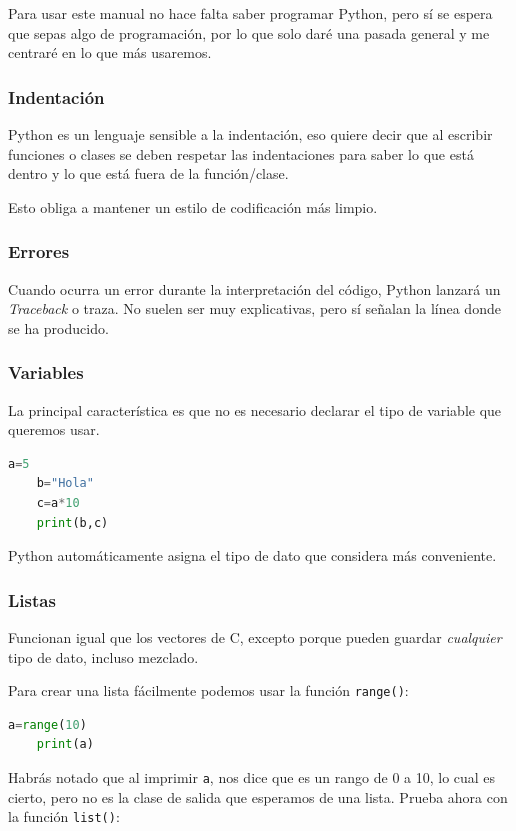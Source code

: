 \documentclass[openany,a4paper]{book}
\begin{document}
Para usar este manual no hace falta saber programar Python, pero sí se espera que sepas algo de programación, por lo que solo daré una pasada general y me centraré en lo que más usaremos.

\subsubsection{Indentación}

Python es un lenguaje sensible a la indentación, eso quiere decir que al escribir funciones o clases se deben respetar las indentaciones para saber lo que está dentro y lo que está fuera de la función/clase.

Esto obliga a mantener un estilo de codificación más limpio.

\subsubsection{Errores}
Cuando ocurra un error durante la interpretación del código, Python lanzará un \textit{Traceback} o traza. No suelen ser muy explicativas, pero sí señalan la línea donde se ha producido.

\subsubsection{Variables}

La principal característica es que no es necesario declarar el tipo de variable que queremos usar.

\begin{lstlisting}[language=Python]
    a=5
    b="Hola"
    c=a*10
    print(b,c)
\end{lstlisting}

Python automáticamente asigna el tipo de dato que considera más conveniente.

\subsubsection{Listas}

Funcionan igual que los vectores de C, excepto porque pueden guardar \textit{cualquier} tipo de dato, incluso mezclado.

Para crear una lista fácilmente podemos usar la función \texttt{range()}:
\begin{lstlisting}[language=Python]
    a=range(10)
    print(a)
\end{lstlisting}

Habrás notado que al imprimir \texttt{a}, nos dice que es un rango de 0 a 10, lo cual es cierto, pero no es la clase de salida que esperamos de una lista. Prueba ahora con la función \texttt{list()}:
\end{document}
